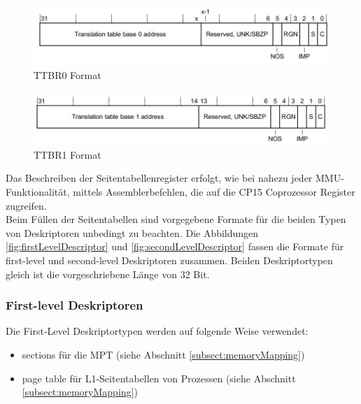 \begin{figure}[H]
	\includegraphics[scale=0.8]{chapters/mmu/figures/ttbr0format}
	\caption{TTBR0 Format \cite[S. B4-1726]{ARM:ARM}}
	\label{fig:TTBR0Format}
\end{figure}


\begin{figure}[H]
	\includegraphics[scale=0.8]{chapters/mmu/figures/ttbr1format}
	\caption{TTBR1 Format \cite[S. B4-1730]{ARM:ARM}}
	\label{fig:TTBR1Format}
\end{figure}

Das Beschreiben der Seitentabellenregister erfolgt, wie bei nahezu jeder MMU-Funktionalität, mittels Assemblerbefehlen, die auf die CP15 Coprozessor Register zugreifen.\\

Beim Füllen der Seitentabellen sind vorgegebene Formate für die beiden Typen von Deskriptoren unbedingt zu beachten. Die Abbildungen \ref{fig:firstLevelDescriptor} und \ref{fig:secondLevelDescriptor} fassen die Formate für first-level und second-level Deskriptoren zusammen. Beiden Deskriptortypen gleich ist die vorgeschriebene Länge von 32 Bit.\\

\subsubsection*{First-level Deskriptoren}

Die First-Level Deskriptortypen werden auf folgende Weise verwendet:

\begin{itemize}
	\item sections für die \ac{MPT} (siehe Abschnitt \ref{subsect:memoryMapping}) 
	\item page table für L1-Seitentabellen von Prozessen (siehe Abschnitt \ref{subsect:memoryMapping})
\end{itemize}

